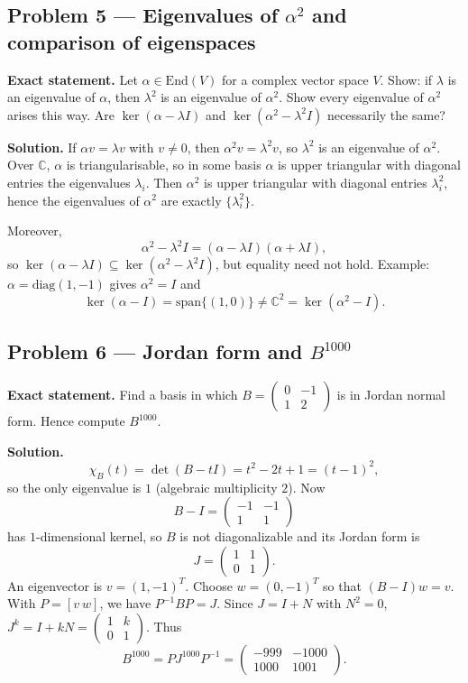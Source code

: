 \documentclass[12pt,a4paper]{article}
\theoremstyle{plain}
\theoremstyle{definition}      %
\begin{document}
\subsection*{Problem 5 — Eigenvalues of $\alpha^2$ and comparison of eigenspaces}

\textbf{Exact statement.}
Let $\alpha\in\mathrm{End}(V)$ for a complex vector space $V$.
Show: if $\lambda$ is an eigenvalue of $\alpha$, then $\lambda^2$ is an eigenvalue of $\alpha^2$.
Show every eigenvalue of $\alpha^2$ arises this way.
Are $\ker(\alpha-\lambda I)$ and $\ker(\alpha^2-\lambda^2 I)$ necessarily the same?

\textbf{Solution.}
If $\alpha v=\lambda v$ with $v\neq 0$, then $\alpha^2v=\lambda^2v$, so $\lambda^2$ is an eigenvalue of $\alpha^2$.
Over $\mathbb C$, $\alpha$ is triangularisable, so in some basis $\alpha$ is upper triangular with diagonal entries the eigenvalues $\lambda_i$.
Then $\alpha^2$ is upper triangular with diagonal entries $\lambda_i^2$, hence the eigenvalues of $\alpha^2$ are exactly $\{\lambda_i^2\}$.

Moreover,
\[
\alpha^2-\lambda^2 I=(\alpha-\lambda I)(\alpha+\lambda I),
\]
so $\ker(\alpha-\lambda I)\subseteq \ker(\alpha^2-\lambda^2 I)$, but equality need not hold.
Example: $\alpha=\mathrm{diag}(1,-1)$ gives $\alpha^2=I$ and
\[
\ker(\alpha-I)=\mathrm{span}\{(1,0)\}\neq \mathbb C^2=\ker(\alpha^2-I).
\]

\subsection*{Problem 6 — Jordan form and $B^{1000}$}

\textbf{Exact statement.}
Find a basis in which $B=\begin{pmatrix}0&-1\\1&2\end{pmatrix}$ is in Jordan normal form.
Hence compute $B^{1000}$.

\textbf{Solution.}
\[
\chi_B(t)=\det(B-tI)=t^2-2t+1=(t-1)^2,
\]
so the only eigenvalue is $1$ (algebraic multiplicity $2$).
Now
\[
B-I=\begin{pmatrix}-1&-1\\1&1\end{pmatrix}
\]
has $1$-dimensional kernel, so $B$ is not diagonalizable and its Jordan form is
\[
J=\begin{pmatrix}1&1\\0&1\end{pmatrix}.
\]
An eigenvector is $v=(1,-1)^T$.
Choose $w=(0,-1)^T$ so that $(B-I)w=v$.
With $P=[v\ w]$, we have $P^{-1}BP=J$.
Since $J=I+N$ with $N^2=0$, $J^k=I+kN=\begin{pmatrix}1&k\\0&1\end{pmatrix}$.
Thus
\[
B^{1000}=P J^{1000} P^{-1}
=\begin{pmatrix}-999&-1000\\1000&1001\end{pmatrix}.
\]
\end{document}
